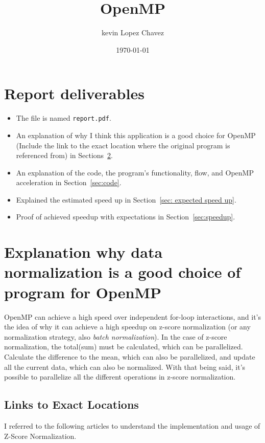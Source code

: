 \documentclass{article}
\title{ OpenMP}
\author{kevin Lopez Chavez}
\date{\today}
\begin{document}
\maketitle

\section{Report deliverables}
\begin{itemize}
    \item The file is named \texttt{report.pdf}.
    \item An explanation of why I think this application is a good choice for OpenMP (Include the link to the exact location where the original program is referenced from) in Sections~\ref{sec:links}. 
    \item An explanation of the code, the program's functionality, flow, and OpenMP acceleration in Section~\ref{sec:code}.
    \item Explained the estimated speed up in Section~\ref{sec: expected speed up}. 
    \item Proof of achieved speedup with expectations in Section~\ref{sec:speedup}.
\end{itemize}


\section{Explanation why data normalization is a good choice of program for OpenMP} \label{sec:links}
OpenMP can achieve a high speed over independent for-loop interactions, and it's the idea of why it can achieve a high speedup on z-score normalization (or any normalization strategy, also \textit{batch normalization}). 
In the case of z-score normalization, the total(sum) must be calculated, which can be parallelized. 
Calculate the difference to the mean, which can also be parallelized, and update all the current data, which can also be normalized. 
With that being said, it's possible to parallelize all the different operations in z-score normalization. 

\subsection{Links to Exact Locations} \label{sec: exact links}
I referred to the following articles to understand the implementation and usage of Z-Score Normalization. 
\end{document}
